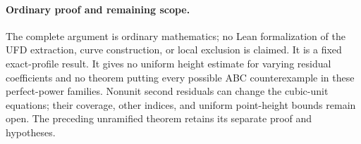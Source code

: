 \paragraph{Ordinary proof and remaining scope.}
The complete argument is ordinary mathematics; no Lean
formalization of the UFD extraction, curve construction,
or local exclusion is claimed. It is a fixed exact-profile
result. It gives no uniform height estimate for varying
residual coefficients and no theorem putting every possible
ABC counterexample in these perfect-power families.
Nonunit second residuals can change the cubic-unit equations;
their coverage, other indices, and uniform point-height
bounds remain open. The preceding unramified theorem
retains its separate proof and hypotheses.
